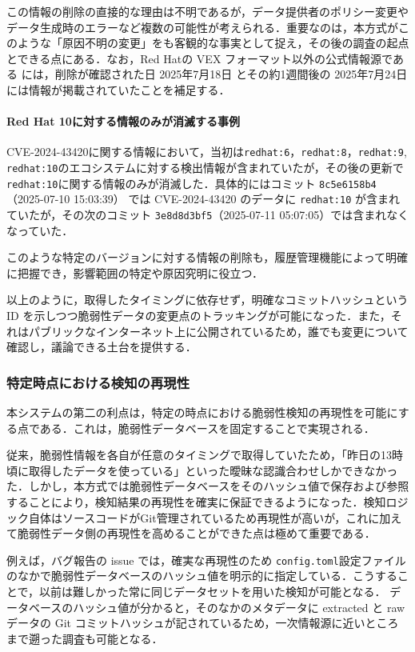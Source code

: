 この情報の削除の直接的な理由は不明であるが，データ提供者のポリシー変更やデータ生成時のエラーなど複数の可能性が考えられる．重要なのは，本方式がこのような「原因不明の変更」をも客観的な事実として捉え，その後の調査の起点とできる点にある．なお，Red Hatの VEX フォーマット以外の公式情報源である \cite{rh-cve-2024-24791-1} \cite{rh-cve-2024-24791-2} には，削除が確認された日 2025年7月18日 とその約1週間後の 2025年7月24日には情報が掲載されていたことを補足する．

\paragraph{Red Hat 10に対する情報のみが消滅する事例}
CVE-2024-43420に関する情報において，当初は\texttt{redhat:6}，\texttt{redhat:8}，\texttt{redhat:9}, \texttt{redhat:10}のエコシステムに対する検出情報が含まれていたが，その後の更新で\texttt{redhat:10}に関する情報のみが消滅した．具体的にはコミット \texttt{8c5e6158b4}（2025-07-10 15:03:39） では CVE-2024-43420 のデータに \texttt{redhat:10} が含まれていたが，その次のコミット \texttt{3e8d8d3bf5}（2025-07-11 05:07:05）では含まれなくなっていた．

このような特定のバージョンに対する情報の削除も，履歴管理機能によって明確に把握でき，影響範囲の特定や原因究明に役立つ．

以上のように，取得したタイミングに依存せず，明確なコミットハッシュという ID を示しつつ脆弱性データの変更点のトラッキングが可能になった．また，それはパブリックなインターネット上に公開されているため，誰でも変更について確認し，議論できる土台を提供する．

\subsubsection{特定時点における検知の再現性}

本システムの第二の利点は，特定の時点における脆弱性検知の再現性を可能にする点である．これは，脆弱性データベースを固定することで実現される．

従来，脆弱性情報を各自が任意のタイミングで取得していたため，「昨日の13時頃に取得したデータを使っている」といった曖昧な認識合わせしかできなかった．しかし，本方式では脆弱性データベースをそのハッシュ値で保存および参照することにより，検知結果の再現性を確実に保証できるようになった．検知ロジック自体はソースコードがGit管理されているため再現性が高いが，これに加えて脆弱性データ側の再現性を高めることができた点は極めて重要である．

例えば，バグ報告の issue \cite{issue-2198}では，確実な再現性のため \texttt{config.toml}設定ファイルのなかで脆弱性データベースのハッシュ値を明示的に指定している．こうすることで，以前は難しかった常に同じデータセットを用いた検知が可能となる．
データベースのハッシュ値が分かると，そのなかのメタデータに extracted と raw データの Git コミットハッシュが記されているため，一次情報源に近いところまで遡った調査も可能となる．

